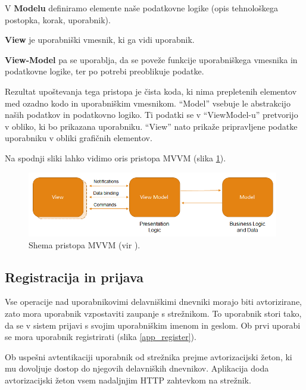 \documentclass[a4paper, 12pt]{book}
\begin{document}
V \textbf{Modelu} definiramo elemente naše podatkovne logike (opis tehnološkega postopka, korak, uporabnik).

\textbf{View} je uporabniški vmesnik, ki ga vidi uporabnik.

\textbf{View-Model} pa se uporablja, da se poveže funkcije uporabniškega vmesnika in podatkovne logike, ter po potrebi preoblikuje podatke.

Rezultat upoštevanja tega pristopa je čista koda, ki nima prepletenih elementov med ozadno kodo in uporabniškim vmesnikom.
\enquote{Model} vsebuje le abstrakcijo naših podatkov in podatkovno logiko.
Ti podatki se v \enquote{ViewModel-u} pretvorijo v obliko, ki bo prikazana uporabniku.
\enquote{View} nato prikaže pripravljene podatke uporabniku v obliki grafičnih elementov.

Na spodnji sliki lahko vidimo oris pristopa MVVM (slika \ref{mvvm}).

\begin{figure}[H]
\begin{center}
\includegraphics[width=11cm]{mvvm}
\end{center}
	\caption{Shema pristopa MVVM (vir \cite{mvvmimage}).}
\label{mvvm}
\end{figure}


\subsection{Registracija in prijava}

Vse operacije nad uporabnikovimi delavniškimi dnevniki morajo biti avtorizirane, zato mora uporabnik vzpostaviti zaupanje s strežnikom.
To uporabnik stori tako, da se v sistem prijavi s svojim uporabniškim imenom in geslom.
Ob prvi uporabi se mora uporabnik registrirati (slika \ref{app_register}).

Ob uspešni avtentikaciji uporabnik od strežnika prejme avtorizacijski žeton, ki mu dovoljuje dostop do njegovih delavniških dnevnikov.
Aplikacija doda avtorizacijski žeton vsem nadaljnjim HTTP zahtevkom na strežnik.
\end{document}
